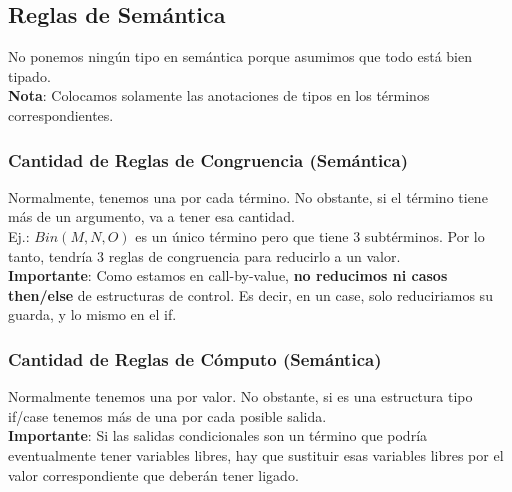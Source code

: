 \documentclass[10pt,a4paper]{article}
\begin{document}
\subsection*{Reglas de Semántica}
No ponemos ningún tipo en semántica porque asumimos que todo está bien tipado. \\
\textbf{Nota}: Colocamos solamente las anotaciones de tipos en los términos correspondientes.
\subsubsection*{Cantidad de Reglas de Congruencia (Semántica)}
Normalmente, tenemos una por cada término. No obstante, si el término tiene más de un argumento, va a tener esa cantidad. \\
Ej.: $Bin(M, N, O)$ es un único término pero que tiene 3 subtérminos. Por lo tanto, tendría 3 reglas de congruencia para reducirlo a un valor. \\
\textbf{Importante}: Como estamos en call-by-value, \textbf{no reducimos ni casos then/else} de estructuras de control. Es decir, en un case, solo reduciriamos su guarda, y lo mismo en el if.
\subsubsection*{Cantidad de Reglas de Cómputo (Semántica)}
Normalmente tenemos una por valor. No obstante, si es una estructura tipo if/case tenemos más de una por cada posible salida. \\
\textbf{Importante}: Si las salidas condicionales son un término que podría eventualmente tener variables libres, hay que sustituir esas variables libres por el valor correspondiente que deberán tener ligado.
\end{document}
